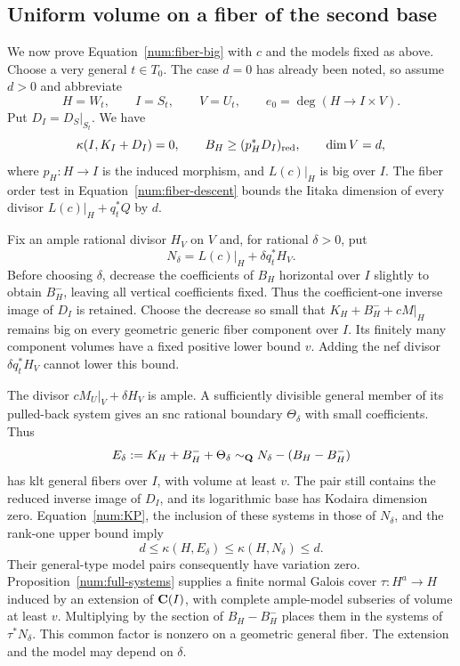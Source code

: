 \subsection{Uniform volume on a fiber of the second base}

We now prove Equation~\eqref{num:fiber-big} with $c$ and the models
fixed as above. Choose a very general $t\in T_0$. The case $d=0$
has already been noted, so assume $d>0$ and abbreviate
\[
 H=W_t,\qquad I=S_t,\qquad V=U_t,
 \qquad e_0=\deg(H\to I\times V).
\]
Put $D_I=D_S|_{S_t}$. We have
\[
 \kappa(I,K_I+D_I)=0,\qquad
 B_H\geq(p_H^*D_I)_{\mathrm{red}},\qquad \dim V=d,
\]
where $p_H:H\to I$ is the induced morphism, and $L(c)|_H$ is
big over $I$.
The fiber order test in Equation~\eqref{num:fiber-descent} bounds
the Iitaka dimension of every divisor $L(c)|_H+q_t^*Q$ by $d$.

Fix an ample rational divisor $H_V$ on $V$ and, for rational
$\delta>0$, put
\[
 N_\delta=L(c)|_H+\delta q_t^*H_V.
\]
Before choosing $\delta$, decrease the coefficients of $B_H$
horizontal over $I$ slightly to obtain $B_H^-$, leaving all vertical
coefficients fixed. Thus the coefficient-one inverse image of $D_I$
is retained. Choose the decrease
so small that $K_H+B_H^-+cM|_H$ remains big on every geometric
generic fiber component over $I$.  Its finitely many component
volumes have a fixed positive lower bound $v$.  Adding the nef
divisor $\delta q_t^*H_V$ cannot lower this bound.

The divisor $cM_U|_V+\delta H_V$ is ample.  A sufficiently divisible
general member of its pulled-back system gives an snc rational
boundary $\Theta_\delta$ with small coefficients.  Thus
\[
 E_\delta:=K_H+B_H^-+\Theta_\delta
 \sim_\mathbf Q N_\delta-(B_H-B_H^-)
\]
has klt general fibers over $I$, with volume at least $v$.
The pair still contains the reduced inverse image of $D_I$, and its
logarithmic base has Kodaira dimension zero. Equation~\eqref{num:KP},
the inclusion of these systems in those of
$N_\delta$, and the rank-one upper bound imply
\[
 d\leq\kappa(H,E_\delta)
 \leq\kappa(H,N_\delta)\leq d.
\]
Their general-type model pairs consequently have variation zero.
Proposition~\ref{num:full-systems} supplies a finite normal Galois
cover $\tau:H^a\to H$ induced by an extension of $\mathbf C(I)$, with
complete ample-model subseries of volume at least $v$.  Multiplying
by the section of $B_H-B_H^-$ places them in the systems of
$\tau^*N_\delta$.  This common factor is nonzero on a geometric
general fiber.  The extension and the model may depend on $\delta$.

